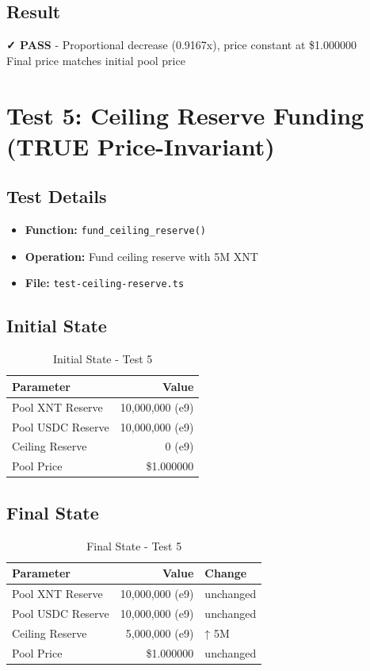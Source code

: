 \documentclass[11pt,a4paper]{article}
\begin{document}
\subsection{Result}
\begin{tcolorbox}[colback=success!10,colframe=success]
\textbf{✓ PASS} - Proportional decrease (0.9167x), price constant at \$1.000000\\
Final price matches initial pool price
\end{tcolorbox}

\newpage

\section{Test 5: Ceiling Reserve Funding (TRUE Price-Invariant)}

\subsection{Test Details}
\begin{itemize}
    \item \textbf{Function:} \texttt{fund\_ceiling\_reserve()}
    \item \textbf{Operation:} Fund ceiling reserve with 5M XNT
    \item \textbf{File:} \texttt{test-ceiling-reserve.ts}
\end{itemize}

\subsection{Initial State}
\begin{table}[h]
\centering
\begin{tabular}{lr}
\toprule
\textbf{Parameter} & \textbf{Value} \\
\midrule
Pool XNT Reserve & 10,000,000 (e9) \\
Pool USDC Reserve & 10,000,000 (e9) \\
Ceiling Reserve & 0 (e9) \\
Pool Price & \$1.000000 \\
\bottomrule
\end{tabular}
\caption{Initial State - Test 5}
\end{table}

\subsection{Final State}
\begin{table}[h]
\centering
\begin{tabular}{lrl}
\toprule
\textbf{Parameter} & \textbf{Value} & \textbf{Change} \\
\midrule
Pool XNT Reserve & 10,000,000 (e9) & unchanged \\
Pool USDC Reserve & 10,000,000 (e9) & unchanged \\
Ceiling Reserve & 5,000,000 (e9) & ↑ 5M \\
Pool Price & \$1.000000 & unchanged \\
\bottomrule
\end{tabular}
\caption{Final State - Test 5}
\end{table}
\end{document}
